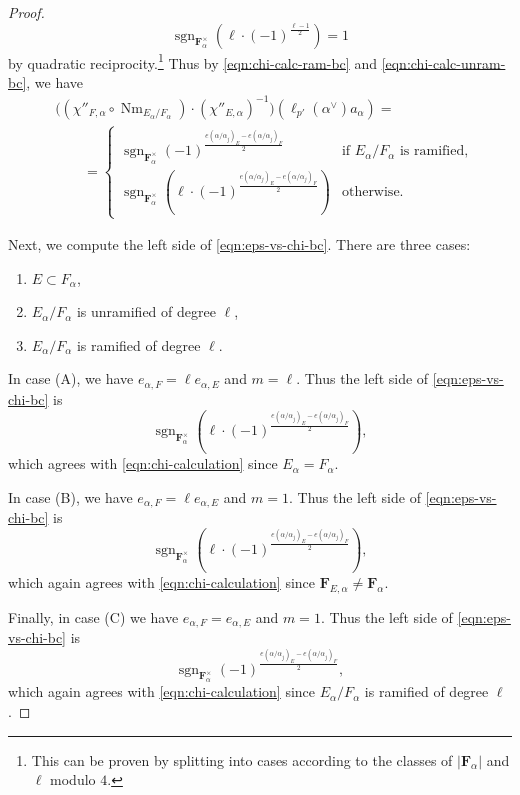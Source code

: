 \documentclass[reqno]{amsart}
\numberwithin{equation}{subsection}
\newcommand{\F}{\mathbf{F}}
\newcommand{\sgn}{\operatorname{sgn}}
\DeclareMathOperator{\Nm}{Nm}
\theoremstyle{remark}
\numberwithin{equation}{subsection}
\numberwithin{figure}{subsection}
\begin{document}
\begin{proof}
\begin{equation}\label{eqn:quadratic-reciprocity-identity}
    \sgn_{\F_\alpha^\times}(\ell \cdot (-1)^{\frac{\ell-1}{2}}) = 1
\end{equation}
by quadratic reciprocity.\footnote{This can be proven by splitting into cases according to the classes of $|\F_\alpha|$ and $\ell$ modulo $4$.} Thus by \eqref{eqn:chi-calc-ram-bc} and \eqref{eqn:chi-calc-unram-bc}, we have
\begin{equation}\label{eqn:chi-calculation}
\begin{aligned}
    &\bigl((\chi''_{F,\alpha} \circ \Nm_{E_\alpha/F_\alpha}) \cdot (\chi''_{E,\alpha})^{-1}\bigr)(\ell_{p'}(\alpha^\vee)a_\alpha) = \\
    &\qquad= \begin{cases}
        \sgn_{\F_\alpha^\times}(-1)^{\frac{e(\alpha/\alpha_j)_E-e(\alpha/\alpha_j)_F}{2}} &\text{if } E_\alpha/F_\alpha \text{ is ramified}, \\
        \sgn_{\F_\alpha^\times}(\ell \cdot (-1)^{\frac{e(\alpha/\alpha_j)_E-e(\alpha/\alpha_j)_F}{2}}) &\text{otherwise.}
    \end{cases}
\end{aligned}
\end{equation}

Next, we compute the left side of \eqref{eqn:eps-vs-chi-bc}. There are three cases:
\begin{enumerate}[label=(\Alph*)]
    \item $E \subset F_\alpha$,
    \item $E_\alpha/F_\alpha$ is unramified of degree $\ell$,
    \item $E_\alpha/F_\alpha$ is ramified of degree $\ell$.
\end{enumerate}

In case (A), we have $e_{\alpha,F}=\ell e_{\alpha,E}$ and $m=\ell$. Thus the left side of \eqref{eqn:eps-vs-chi-bc} is
\[
\sgn_{\F_\alpha^\times}(\ell\cdot(-1)^{\frac{e(\alpha/\alpha_j)_E-e(\alpha/\alpha_j)_F}{2}}),
\]
which agrees with \eqref{eqn:chi-calculation} since $E_\alpha=F_\alpha$. 

In case (B), we have $e_{\alpha,F} = \ell e_{\alpha,E}$ and $m = 1$. Thus the left side of \eqref{eqn:eps-vs-chi-bc} is 
\[
\sgn_{\F_\alpha^\times}(\ell \cdot (-1)^{\frac{e(\alpha/\alpha_j)_E-e(\alpha/\alpha_j)_F}{2}}),
\]
which again agrees with \eqref{eqn:chi-calculation} since $\F_{E,\alpha} \neq \F_\alpha$.

Finally, in case (C) we have $e_{\alpha,F} = e_{\alpha,E}$ and $m = 1$. Thus the left side of \eqref{eqn:eps-vs-chi-bc} is
\[
\sgn_{\F_\alpha^\times}(-1)^{\frac{e(\alpha/\alpha_j)_E - e(\alpha/\alpha_j)_F}{2}},
\]
which again agrees with \eqref{eqn:chi-calculation} since $E_\alpha/F_\alpha$ is ramified of degree $\ell$.
\end{proof}



\end{document}
